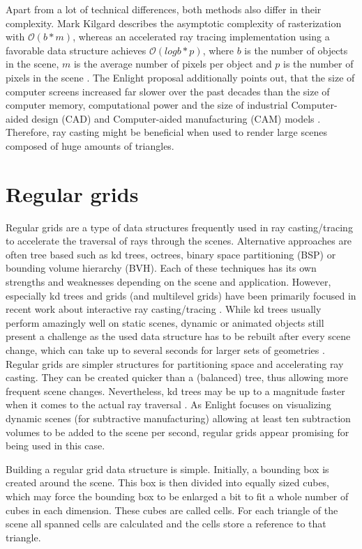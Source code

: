 Apart from a lot of technical differences, both methods also differ in their complexity. Mark Kilgard describes the asymptotic complexity of rasterization with $\mathcal{O}(b * m)$, whereas an accelerated ray tracing implementation using a favorable data structure achieves $\mathcal{O}(log b * p)$, where $b$ is the number of objects in the scene, $m$ is the average number of pixels per object and $p$ is the number of pixels in the scene \cite[p.48]{ray_casting_presentation}. The Enlight proposal additionally points out, that the size of computer screens increased far slower over the past decades than the size of computer memory, computational power and the size of industrial Computer-aided design (CAD) and Computer-aided manufacturing (CAM) models \cite{enlight_proposal}. Therefore, ray casting might be beneficial when used to render large scenes composed of huge amounts of triangles.


\section{Regular grids}
\label{sec:regular_grids}

Regular grids are a type of data structures frequently used in ray casting/tracing to accelerate the traversal of rays through the scenes. Alternative approaches are often tree based such as kd trees, octrees, binary space partitioning (BSP) or bounding volume hierarchy (BVH). Each of these techniques has its own strengths and weaknesses depending on the scene and application. However, especially kd trees and grids (and multilevel grids) have been primarily focused in recent work about interactive ray casting/tracing \cite[ch.1]{packet_caster}. While kd trees usually perform amazingly well on static scenes, dynamic or animated objects still present a challenge as the used data structure has to be rebuilt after every scene change, which can take up to several seconds for larger sets of geometries \cite[ch.1]{packet_caster}. Regular grids are simpler structures for partitioning space and accelerating ray casting. They can be created quicker than a (balanced) tree, thus allowing more frequent scene changes. Nevertheless, kd trees may be up to a magnitude faster when it comes to the actual ray traversal \cite[ch.1]{packet_caster}. As Enlight focuses on visualizing dynamic scenes (for subtractive manufacturing) allowing at least ten subtraction volumes to be added to the scene per second, regular grids appear promising for being used in this case.

Building a regular grid data structure is simple. Initially, a bounding box is created around the scene. This box is then divided into equally sized cubes, which may force the bounding box to be enlarged a bit to fit a whole number of cubes in each dimension. These cubes are called cells. For each triangle of the scene all spanned cells are calculated and the cells store a reference to that triangle.

